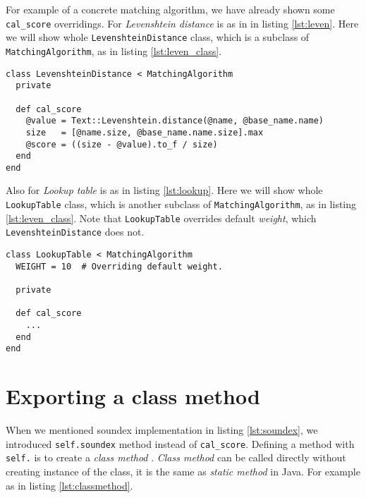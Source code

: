For example of a concrete matching algorithm,
we have already shown some \texttt{cal\_score} overridings. For
\emph{Levenshtein distance} is as in in listing \ref{lst:leven}.
Here we will show whole \texttt{LevenshteinDistance} class,
which is a subclass of \texttt{MatchingAlgorithm}, as in listing \ref{lst:leven_class}.

\begin{minipage}{\linewidth}
\begin{lstlisting}[label={lst:leven_class}, caption={\texttt{LevenshteinDistance} class.}]
class LevenshteinDistance < MatchingAlgorithm
  private

  def cal_score
    @value = Text::Levenshtein.distance(@name, @base_name.name)
    size   = [@name.size, @base_name.name.size].max
    @score = ((size - @value).to_f / size)
  end
end
\end{lstlisting}
\end{minipage}

Also for \emph{Lookup table} is as in listing \ref{lst:lookup}.
Here we will show whole \texttt{LookupTable} class,
which is another subclass of \texttt{MatchingAlgorithm}, as in listing \ref{lst:leven_class}.
Note that \texttt{LookupTable} overrides default \emph{weight}, which
\texttt{LevenshteinDistance} does not.

\begin{minipage}{\linewidth}
\begin{lstlisting}[label={lst:lt_class}, caption={\texttt{LookupTable} class.}]
class LookupTable < MatchingAlgorithm
  WEIGHT = 10  # Overriding default weight.

  private

  def cal_score
    ...
  end
end
\end{lstlisting}
\end{minipage}

\section{Exporting a class method}

When we mentioned soundex implementation in listing \ref{lst:soundex},
we introduced \texttt{self.soundex} method instead of \texttt{cal\_score}.
Defining a method with \texttt{self.} is to create a \emph{class method} \cite[]{classmethod}.
\emph{Class method} can be called directly without creating instance of the class,
it is the same as \emph{static method} in Java. For example as in listing
\ref{lst:classmethod}.

